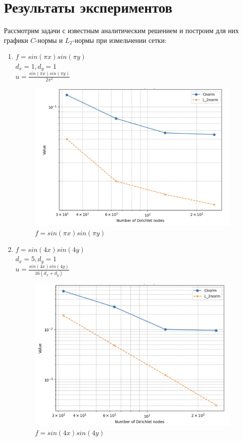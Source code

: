 \documentclass[12pt]{report}
\begin{document}
\section{Результаты экспериментов}
Рассмотрим задачи с известным аналитическим решением и построим для них графики $C$-нормы и $L_2$-нормы при измельчении сетки:
\begin{enumerate}
    \item $f = sin(\pi x)sin(\pi y)$\\
    $d_x = 1, d_y = 1$ \\
    $u = \frac{sin(\pi x)sin(\pi y)}{2\pi^2}$
    \begin{figure}[h]
        \begin{center}
        \includegraphics[scale=0.4]{gr_2.1.png}
        \caption{$f = sin(\pi x)sin(\pi y)$}
        \end{center}
    \end{figure}
    \newpage
    \item $f = sin(4 x)sin(4 y)$\\
    $d_x = 5, d_y = 1$ \\
    $u = \frac{sin(4x)sin(4y)}{16(d_x+d_y)}$
    \begin{figure}[h]
        \begin{center}
        \includegraphics[scale=0.4]{gr_2.2.png}
        \caption{$f = sin(4x)sin(4y)$}
        \end{center}
    \end{figure}
\end{enumerate}
\end{document}
